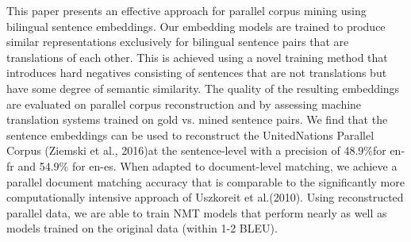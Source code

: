 This paper presents an effective approach for parallel  corpus  mining  using  bilingual  sentence embeddings. Our embedding models are trained to produce similar representations exclusively for bilingual sentence pairs that are translations  of  each  other.   This  is  achieved using a novel training method that introduces hard negatives consisting of sentences that are not  translations  but  have  some  degree  of  semantic  similarity.   The  quality  of  the  resulting embeddings are evaluated on parallel corpus reconstruction and by assessing machine translation systems trained on gold vs. mined sentence pairs.  We find that the sentence embeddings can be used to reconstruct the UnitedNations Parallel Corpus (Ziemski et al., 2016)at the sentence-level with a precision of 48.9\%for en-fr and 54.9\% for en-es.  When adapted to document-level matching, we achieve a parallel document matching accuracy that is comparable  to  the  significantly  more  computationally intensive approach of Uszkoreit et al.(2010).  Using reconstructed parallel data, we are  able  to  train  NMT  models  that  perform nearly as well as models trained on the original data (within 1-2 BLEU).
